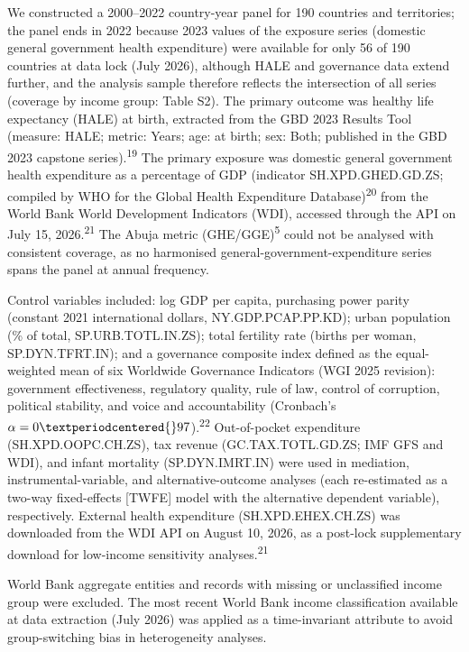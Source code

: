 \documentclass[12pt,a4paper]{article}
\begin{document}
We constructed a 2000--2022 country-year panel for 190 countries and territories; the panel ends in 2022 because 2023 values of the exposure series (domestic general government health expenditure) were available for only 56 of 190 countries at data lock (July 2026), although HALE and governance data extend further, and the analysis sample therefore reflects the intersection of all series (coverage by income group: Table S2). The primary outcome was healthy life expectancy (HALE)
at birth, extracted from the GBD 2023 Results Tool (measure: HALE; metric:
Years; age: at birth; sex: Both; published in the GBD 2023 capstone
series).\textsuperscript{19} The primary exposure was
domestic general government health expenditure as a percentage of GDP
(indicator SH.XPD.GHED.GD.ZS; compiled by WHO for the Global Health
Expenditure Database)\textsuperscript{20} from the World Bank World Development Indicators (WDI),
accessed through the API on July 15, 2026.\textsuperscript{21} The Abuja metric
(GHE/GGE)\textsuperscript{5} could not be analysed with consistent coverage, as no harmonised
general-government-expenditure series spans the panel at annual frequency.

Control variables included: log GDP per capita, purchasing power parity
(constant 2021 international dollars, NY.GDP.PCAP.PP.KD); urban population (\% of total,
SP.URB.TOTL.IN.ZS); total fertility rate (births per woman, SP.DYN.TFRT.IN);
and a governance composite index defined as the equal-weighted mean of six
Worldwide Governance Indicators (WGI 2025 revision): government effectiveness,
regulatory quality, rule of law, control of corruption, political stability, and
voice and accountability (Cronbach's $\alpha = 0{\textperiodcentered{}}97$).\textsuperscript{22}
Out-of-pocket expenditure (SH.XPD.OOPC.CH.ZS), tax revenue
(GC.TAX.TOTL.GD.ZS; IMF GFS and WDI), and infant mortality (SP.DYN.IMRT.IN)
were used in mediation, instrumental-variable, and alternative-outcome
analyses (each re-estimated as a two-way fixed-effects [TWFE] model with the alternative dependent variable), respectively. External health expenditure (SH.XPD.EHEX.CH.ZS) was downloaded from the WDI API on August 10, 2026, as a post-lock supplementary download for low-income sensitivity analyses.\textsuperscript{21}

World Bank aggregate entities and records with missing or unclassified income group were excluded. The most recent World Bank income classification available at data extraction (July 2026) was
applied as a time-invariant attribute to avoid group-switching bias in heterogeneity analyses.
\end{document}
